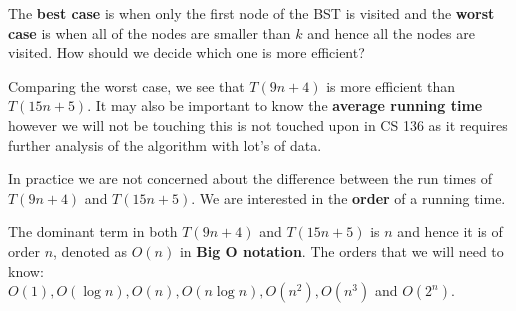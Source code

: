 The \textbf{best case} is when only the first node of the BST is visited and the \textbf{worst case} is when all of the nodes are smaller than $k$ and hence all the nodes are visited. How should we decide which one is more efficient?\\


Comparing the worst case, we see that $T(9n + 4)$ is more efficient than $T(15n + 5)$. It may also be important to know the \textbf{average running time} however we will not be touching this is not touched upon in CS 136 as it requires further analysis of the algorithm with lot's of data.\\


In practice we are not concerned about the difference between the run times of $T(9n + 4)$ and $T(15n + 5)$. We are interested in the \textbf{order} of a running time.\\



The dominant term in both $T(9n + 4)$ and $T(15n + 5)$ is $n$ and hence it is of order $n$, denoted as $O(n)$ in \textbf{Big O notation}. The orders that we will need to know:\\

$O(1), O(\log{n}), O(n), O(n\log{n}), O(n^{2}), O(n^{3})$ and $O(2^{n})$.\\


